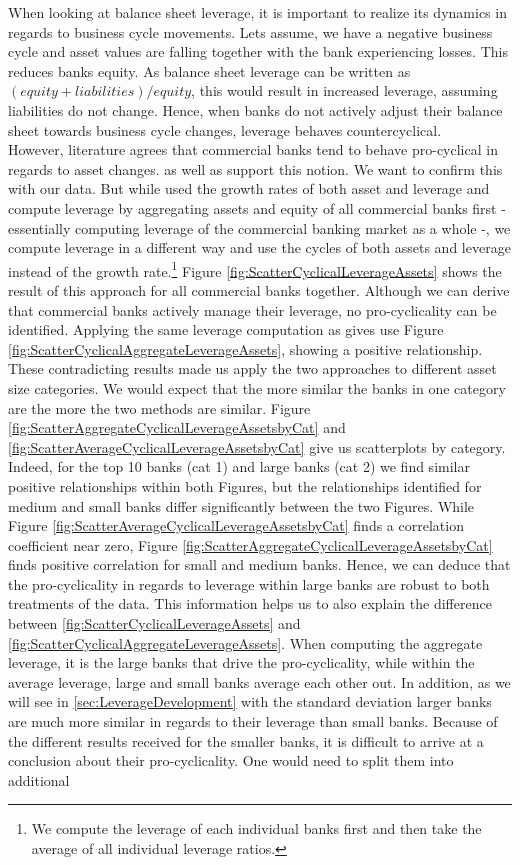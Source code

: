 \documentclass[12pt, a4paper]{article} %
\begin{document}
When looking at balance sheet leverage, it is important to realize its dynamics in regards to business cycle movements.
Lets assume, we have a negative business cycle and asset values are falling together with the bank experiencing losses. This reduces banks equity. As balance sheet leverage can be written as $(equity + liabilities)/equity$, this would result in increased leverage, assuming liabilities do not change. Hence, when banks do not actively adjust their balance sheet towards business cycle changes, leverage behaves countercyclical.\\
However, literature agrees that commercial banks tend to behave pro-cyclical in regards to asset changes. \citet{AdrianShin2011} as well as \citet{Greenwell} support this notion. We want to confirm this with our data. But while \citet{AdrianShin2011} used the growth rates of both asset and leverage and compute leverage by aggregating assets and equity of all commercial banks first - essentially computing leverage of the commercial banking market as a whole -, we compute leverage in a different way and use the cycles of both assets and leverage instead of the growth rate.\footnote{We compute the leverage of each individual banks first and then take the average of all individual leverage ratios.} Figure \ref{fig:ScatterCyclicalLeverageAssets} shows the result of this approach for all commercial banks together. Although we can derive that commercial banks actively manage their leverage, no pro-cyclicality can be identified. Applying the same leverage computation as \citet{AdrianShin2011} gives use Figure \ref{fig:ScatterCyclicalAggregateLeverageAssets}, showing a positive relationship. These contradicting results made us apply the two approaches to different asset size categories. We would expect that the more similar the banks in one category are the more the two methods are similar. Figure \ref{fig:ScatterAggregateCyclicalLeverageAssetsbyCat} and \ref{fig:ScatterAverageCyclicalLeverageAssetsbyCat} give us scatterplots by category. Indeed, for the top 10 banks (cat 1) and large banks (cat 2) we find similar positive relationships within both Figures, but the relationships identified for medium and small banks differ significantly between the two Figures. While Figure \ref{fig:ScatterAverageCyclicalLeverageAssetsbyCat} finds a correlation coefficient near zero, Figure \ref{fig:ScatterAggregateCyclicalLeverageAssetsbyCat} finds positive correlation for small and medium banks. Hence, we can deduce that the pro-cyclicality in regards to leverage within large banks are robust to both treatments of the data. This information helps us to also explain the difference between \ref{fig:ScatterCyclicalLeverageAssets} and \ref{fig:ScatterCyclicalAggregateLeverageAssets}. When computing the aggregate leverage, it is the large banks that drive the pro-cyclicality, while within the average leverage, large and small banks average each other out. In addition, as we will see in \ref{sec:LeverageDevelopment} with the standard deviation larger banks are much more similar in regards to their leverage than small banks. Because of the different results received for the smaller banks, it is difficult to arrive at a conclusion about their pro-cyclicality. One would need to split them into additional 
\end{document}
